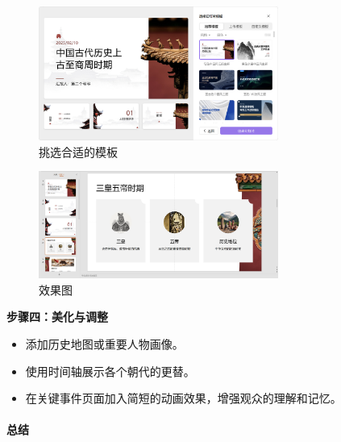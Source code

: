 \centering
\begin{figure}[H] %
  \centering %
  \includegraphics[width=0.7\textwidth]{assets/figures/image-20250210192952252.png} %
  \caption{挑选合适的模板} %
  \label{Fig.main1} %
\end{figure}%

\centering
\begin{figure}[H] %
  \centering %
  \includegraphics[width=0.7\textwidth]{assets/figures/image-20250210193018631.png} %
  \caption{效果图} %
  \label{Fig.main1} %
\end{figure}%

\textbf{步骤四：美化与调整}

\begin{itemize}

  \item
        添加历史地图或重要人物画像。
  \item
        使用时间轴展示各个朝代的更替。
  \item
        在关键事件页面加入简短的动画效果，增强观众的理解和记忆。
\end{itemize}

\hypertarget{ux603bux7ed3}{%
  \paragraph{总结}\label{ux603bux7ed3}}

